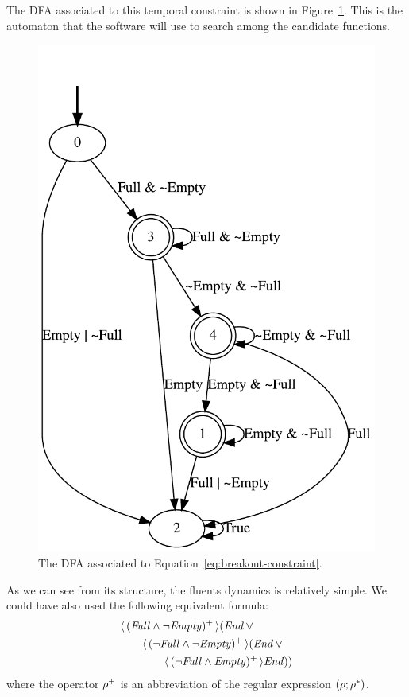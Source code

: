 The DFA associated to this temporal constraint is shown in
Figure~\ref{fig:breakout-constraint}. This is the automaton that the software
will use to search among the candidate functions.
\begin{figure}
	\centering
	\includegraphics[height=0.5\textheight]{./imgs/br_constraints.pdf}
	\caption{The DFA associated to Equation~\eqref{eq:breakout-constraint}.}
	\label{fig:breakout-constraint}
\end{figure}
As we can see from its structure, the fluents dynamics is relatively simple.
We could have also used the following equivalent formula:
\begin{equation}
	\begin{aligned}
		&\langle\, {(\text{\textit{Full}} \land \neg \text{\textit{Empty}})^+} \,\rangle
			(\text{\textit{End}} \,\lor \\
		&\qquad\langle\, {(\neg \text{\textit{Full}} \land \neg \text{\textit{Empty}})^+} \,\rangle
			(\text{\textit{End}} \,\lor \\
		&\qquad\qquad \langle\, {(\neg \text{\textit{Full}} \land \text{\textit{Empty}})^+} \,\rangle
			\text{\textit{End}}))
	\end{aligned}
\end{equation}
where the operator $\rho^+$ is an abbreviation of the regular expression
$(\rho; \rho^*)$.

